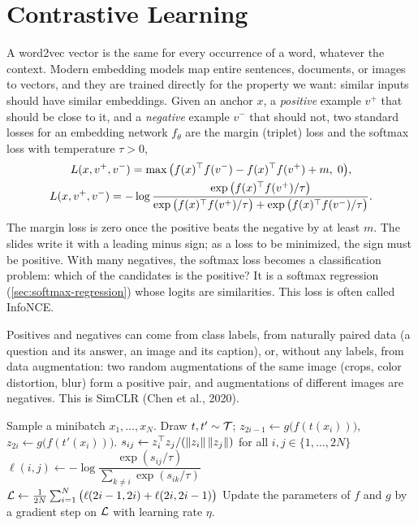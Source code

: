 \section{Contrastive Learning}\label{sec:contrastive}

A word2vec vector is the same for every occurrence of a word, whatever the context. Modern embedding models map entire sentences, documents, or images to vectors, and they are trained directly for the property we want: similar inputs should have similar embeddings. Given an anchor $x$, a \emph{positive} example $v^+$ that should be close to it, and a \emph{negative} example $v^-$ that should not, two standard losses for an embedding network $f_\theta$ are the margin (triplet) loss and the softmax loss with temperature $\tau>0$,
\begin{gather*}
L(x,v^+,v^-)=\max\big(f(x)^{\top} f(v^-)-f(x)^{\top} f(v^+)+m,\;0\big),\\
L(x,v^+,v^-)=-\log\frac{\exp\big(f(x)^{\top} f(v^+)/\tau\big)}{\exp\big(f(x)^{\top} f(v^+)/\tau\big)+\exp\big(f(x)^{\top} f(v^-)/\tau\big)}.
\end{gather*}
The margin loss is zero once the positive beats the negative by at least $m$. The slides write it with a leading minus sign; as a loss to be minimized, the sign must be positive. With many negatives, the softmax loss becomes a classification problem: which of the candidates is the positive? It is a softmax regression (\cref{sec:softmax-regression}) whose logits are similarities. This loss is often called InfoNCE.

Positives and negatives can come from class labels, from naturally paired data (a question and its answer, an image and its caption), or, without any labels, from data augmentation: two random augmentations of the same image (crops, color distortion, blur) form a positive pair, and augmentations of different images are negatives. This is SimCLR (Chen et al., 2020).

\begin{algorithm}[H]
\caption{SimCLR}\label{alg:simclr}
\begin{algorithmic}[1]
\Repeat
  \State Sample a minibatch $x_1,\dots,x_N$.
    \State Draw $t,t'\sim\mathcal{T}$; \quad $z_{2i-1}\gets g\big(f(t(x_i))\big)$, \quad $z_{2i}\gets g\big(f(t'(x_i))\big)$.
  \EndFor
  \State $s_{ij}\gets z_i^{\top} z_j/(\lVert z_i\rVert\,\lVert z_j\rVert)$ for all $i,j\in\{1,\dots,2N\}$ 
  \State $\ell(i,j)\gets-\log\dfrac{\exp(s_{ij}/\tau)}{\sum_{k\ne i}\exp(s_{ik}/\tau)}$
  \State $\mathcal{L}\gets\frac1{2N}\sum_{i=1}^N\big(\ell(2i-1,2i)+\ell(2i,2i-1)\big)$
  \State Update the parameters of $f$ and $g$ by a gradient step on $\mathcal{L}$ with learning rate $\eta$.
\end{algorithmic}
\end{algorithm}

